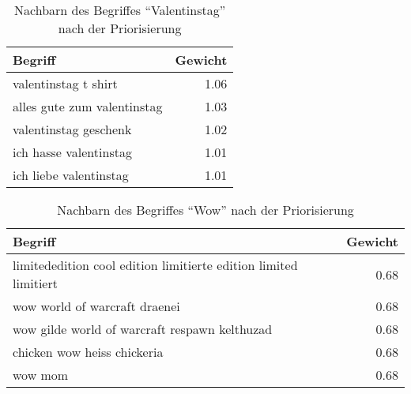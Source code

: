 \begin{table}[ht]
\centering
\begin{tabular*}{0.9\textwidth}{@{\extracolsep{\fill} } lr}
    \toprule
    Begriff & Gewicht \\
    \midrule
    valentinstag t shirt & \num{1.06} \\
    alles gute zum valentinstag & \num{1.03} \\
    valentinstag geschenk & \num{1.02} \\
    ich hasse valentinstag & \num{1.01} \\
    ich liebe valentinstag & \num{1.01} \\
    \bottomrule
\end{tabular*}
\caption{Nachbarn des Begriffes ``Valentinstag'' nach der Priorisierung}
\label{tab:prio_res_valentinstag}
\end{table}

\begin{table}[ht]
\centering
\begin{tabular*}{0.9\textwidth}{@{\extracolsep{\fill} } lr}
    \toprule
    Begriff & Gewicht \\
    \midrule
    limitededition cool edition limitierte edition limited limitiert & \num{0.68} \\
    wow world of warcraft draenei & \num{0.68} \\
    wow gilde world of warcraft respawn kelthuzad & \num{0.68} \\
    chicken wow heiss chickeria & \num{0.68} \\
    wow mom & \num{0.68} \\
    \bottomrule
\end{tabular*}
\caption{Nachbarn des Begriffes ``Wow'' nach der Priorisierung}
\label{tab:prio_res_wow}
\end{table}